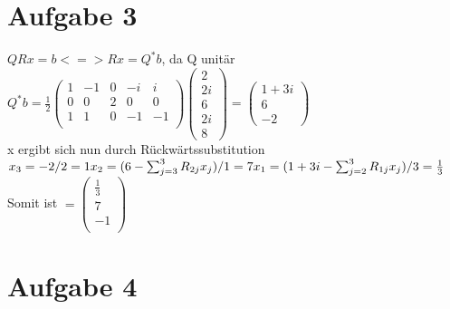 \documentclass[10pt,a4paper]{article}
\begin{document}
\section*{Aufgabe 3}
$QRx = b <=> Rx = Q^*b$, da Q unitär\\
$Q^*b = \frac{1}{2}\begin{pmatrix}
    1 & -1 & 0 & -i & i\\
    0 & 0 & 2 & 0 & 0\\
    1 & 1 & 0 & -1 & -1\\
\end{pmatrix}
\begin{pmatrix}
    2\\
    2i\\
    6\\
    2i\\
    8
\end{pmatrix} = 
\begin{pmatrix}
    1+3i\\
    6\\
    -2
\end{pmatrix}$\\
x ergibt sich nun durch Rückwärtssubstitution\\
$x_3 = -2/2 = 1\\
x_2 = (6 - \sum_{j=3}^{3} R_{2j}x_j)/1 = 7\\
x_1 = (1+3i - \sum_{j=2}^{3} R_{1j}x_j) / 3 = \frac{1}{3}\\$
Somit ist $ = \begin{pmatrix}
    \frac{1}{3}\\
    7\\
    -1\\
\end{pmatrix}$

\section*{Aufgabe 4}

\end{document}
